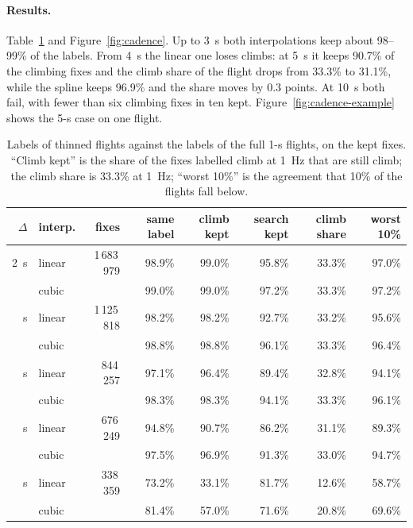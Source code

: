 \paragraph{Results.} Table~\ref{tab:cadence-results} and Figure~\ref{fig:cadence}. Up to 3~s both
interpolations keep about 98--99\% of the labels. From 4~s the linear one loses climbs: at 5~s it
keeps 90.7\% of the climbing fixes and the climb share of the flight drops from 33.3\% to 31.1\%,
while the spline keeps 96.9\% and the share moves by 0.3 points. At 10~s both fail, with fewer than
six climbing fixes in ten kept. Figure~\ref{fig:cadence-example} shows the 5-s case on one flight.

\begin{table}
\centering
\small
\setlength{\tabcolsep}{5pt}
\begin{tabular}{@{}r l r r r r r r@{}}
\toprule
$\Delta$ & interp. & fixes & same label & climb kept & search kept & climb share & worst 10\% \\
\midrule
2~s & linear & 1\,683\,979 & 98.9\% & 99.0\% & 95.8\% & 33.3\% & 97.0\% \\
    & cubic  &             & 99.0\% & 99.0\% & 97.2\% & 33.3\% & 97.2\% \\ \addlinespace
3~s & linear & 1\,125\,818 & 98.2\% & 98.2\% & 92.7\% & 33.2\% & 95.6\% \\
    & cubic  &             & 98.8\% & 98.8\% & 96.1\% & 33.3\% & 96.4\% \\ \addlinespace
4~s & linear & 844\,257 & 97.1\% & 96.4\% & 89.4\% & 32.8\% & 94.1\% \\
    & cubic  &          & 98.3\% & 98.3\% & 94.1\% & 33.3\% & 96.1\% \\ \addlinespace
5~s & linear & 676\,249 & 94.8\% & 90.7\% & 86.2\% & 31.1\% & 89.3\% \\
    & cubic  &          & 97.5\% & 96.9\% & 91.3\% & 33.0\% & 94.7\% \\ \addlinespace
10~s & linear & 338\,359 & 73.2\% & 33.1\% & 81.7\% & 12.6\% & 58.7\% \\
     & cubic  &          & 81.4\% & 57.0\% & 71.6\% & 20.8\% & 69.6\% \\
\bottomrule
\end{tabular}
\caption{Labels of thinned flights against the labels of the full 1-s flights, on the kept fixes.
``Climb kept'' is the share of the fixes labelled climb at 1~Hz that are still climb; the climb
share is 33.3\% at 1~Hz; ``worst 10\%'' is the agreement that 10\% of the flights fall below.}
\label{tab:cadence-results}
\end{table}

